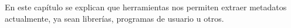 En este capítulo se explican que herramientas nos permiten extraer metadatos actualmente, ya sean librerías, programas de usuario u otros.
